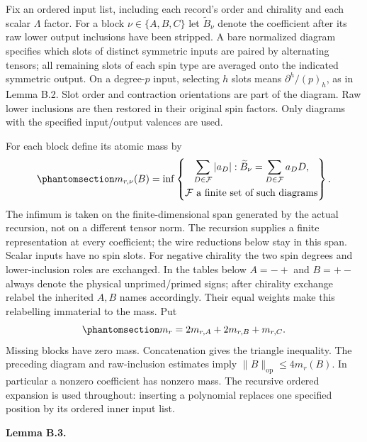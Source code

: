 \documentclass[
  english,
  11pt,
  reqno]{amsart}
\makeatletter
\newcommand{\pandocstatementheading}[1]{%
  \par\addpenalty{\@beginparpenalty}%
  \addvspace{.5\baselineskip plus .2\baselineskip minus .2\baselineskip}%
  {\normalfont\bfseries #1\par}%
  \nobreak\@afterindenttrue\@afterheading
}
\makeatother
\begin{document}
Fix an ordered input list, including each record's order and chirality
and each scalar \(\Lambda\) factor. For a block \(\nu\in\{A,B,C\}\) let
\(\widetilde B_\nu\) denote the coefficient after its raw lower output
inclusions have been stripped. A bare normalized diagram specifies which
slots of distinct symmetric inputs are paired by alternating tensors;
all remaining slots of each spin type are averaged onto the indicated
symmetric output. On a degree-\(p\) input, selecting \(h\) slots means
\(\partial^h/(p)_h\), as in Lemma B.2. Slot order and contraction
orientations are part of the diagram. Raw lower inclusions are then
restored in their original spin factors. Only diagrams with the
specified input/output valences are used.

For each block define its atomic mass by
\begin{equation}\protect\phantomsection\label{eq:gg-budget-atomic-mass}{
 m_{r,\nu}(B)=\inf\left\{\begin{gathered}
\sum_{D\in\mathcal F}|a_D|:
        \widetilde B_\nu=\sum_{D\in\mathcal F}a_DD, \\
\mathcal F\text{ a finite set of such diagrams}
\end{gathered}\right\}.
}\end{equation} The infimum is taken on the finite-dimensional span
generated by the actual recursion, not on a different tensor norm. The
recursion supplies a finite representation at every coefficient; the
wire reductions below stay in this span. Scalar inputs have no spin
slots. For negative chirality the two spin degrees and lower-inclusion
roles are exchanged. In the tables below \(A=-+\) and \(B=+-\) always
denote the physical unprimed/primed signs; after chirality exchange
relabel the inherited \(A,B\) names accordingly. Their equal weights
make this relabelling immaterial to the mass. Put
\begin{equation}\protect\phantomsection\label{eq:gg-budget-common-mass}{
 m_r=2m_{r,A}+2m_{r,B}+m_{r,C}.
}\end{equation} Missing blocks have zero mass. Concatenation gives the
triangle inequality. The preceding diagram and raw-inclusion estimates
imply \(\|B\|_{\mathrm{op}}\le4m_r(B)\). In particular a nonzero
coefficient has nonzero mass. The recursive ordered expansion is used
throughout: inserting a polynomial replaces one specified position by
its ordered inner input list.

\pandocstatementheading{\protect{}\label{lem:gg-budget-transfers}Lemma B.3.}
\end{document}
